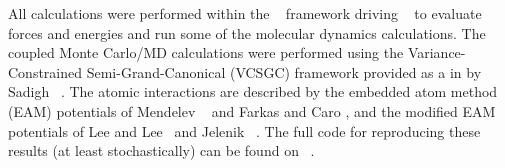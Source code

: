 All calculations were performed within the ~\cite{pyiron, pyiron-paper} framework driving ~\cite{lammps, plimpton1995fast} to evaluate forces and energies and run some of the molecular dynamics calculations.
The coupled Monte Carlo/MD calculations were performed using the Variance-Constrained Semi-Grand-Canonical (VCSGC) framework provided as a  in  by Sadigh \etal~\cite{sadigh2012calculation, sadigh2012scalable}.
The atomic interactions are described by the embedded atom method (EAM) potentials of Mendelev \etal~\cite{mendelev2005effect} and Farkas and Caro \cite{farkas2020model}, and the modified EAM potentials of Lee and Lee~\cite{lee2010modified} and Jelenik \etal~\cite{jelinek2012modified}.
The full code for reproducing these results (at least stochastically) can be found on ~\cite{feal}.
